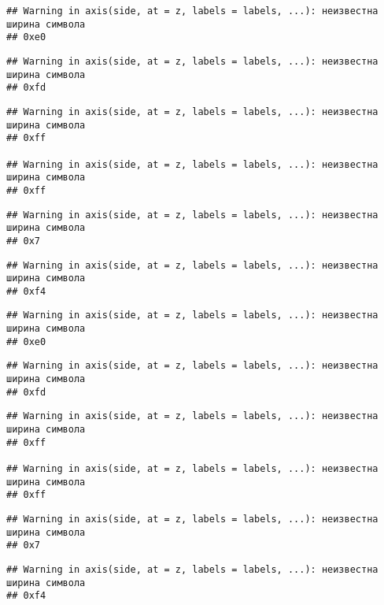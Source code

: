 \documentclass[
]{article}
\begin{document}
\begin{verbatim}
## Warning in axis(side, at = z, labels = labels, ...): неизвестна ширина символа
## 0xe0
\end{verbatim}

\begin{verbatim}
## Warning in axis(side, at = z, labels = labels, ...): неизвестна ширина символа
## 0xfd
\end{verbatim}

\begin{verbatim}
## Warning in axis(side, at = z, labels = labels, ...): неизвестна ширина символа
## 0xff

## Warning in axis(side, at = z, labels = labels, ...): неизвестна ширина символа
## 0xff
\end{verbatim}

\begin{verbatim}
## Warning in axis(side, at = z, labels = labels, ...): неизвестна ширина символа
## 0x7
\end{verbatim}

\begin{verbatim}
## Warning in axis(side, at = z, labels = labels, ...): неизвестна ширина символа
## 0xf4
\end{verbatim}

\begin{verbatim}
## Warning in axis(side, at = z, labels = labels, ...): неизвестна ширина символа
## 0xe0
\end{verbatim}

\begin{verbatim}
## Warning in axis(side, at = z, labels = labels, ...): неизвестна ширина символа
## 0xfd
\end{verbatim}

\begin{verbatim}
## Warning in axis(side, at = z, labels = labels, ...): неизвестна ширина символа
## 0xff

## Warning in axis(side, at = z, labels = labels, ...): неизвестна ширина символа
## 0xff
\end{verbatim}

\begin{verbatim}
## Warning in axis(side, at = z, labels = labels, ...): неизвестна ширина символа
## 0x7
\end{verbatim}

\begin{verbatim}
## Warning in axis(side, at = z, labels = labels, ...): неизвестна ширина символа
## 0xf4
\end{verbatim}
\end{document}
